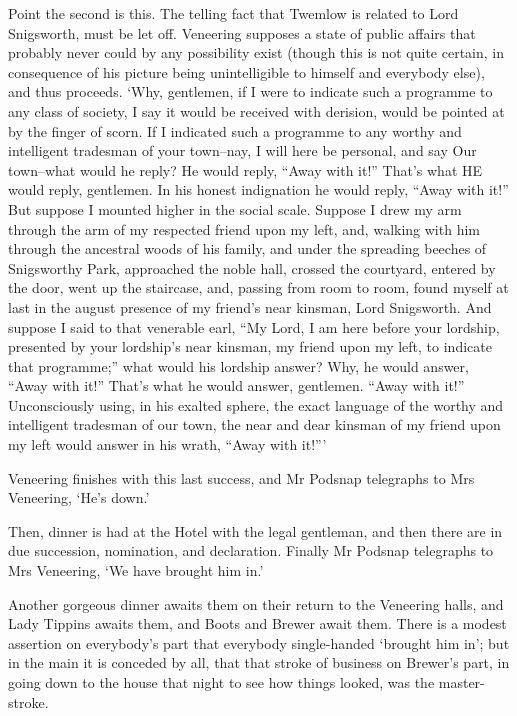 Point the second is this. The telling fact that Twemlow is related to
Lord Snigsworth, must be let off. Veneering supposes a state of public
affairs that probably never could by any possibility exist (though this
is not quite certain, in consequence of his picture being unintelligible
to himself and everybody else), and thus proceeds. ‘Why, gentlemen, if
I were to indicate such a programme to any class of society, I say it
would be received with derision, would be pointed at by the finger of
scorn. If I indicated such a programme to any worthy and intelligent
tradesman of your town--nay, I will here be personal, and say Our
town--what would he reply? He would reply, “Away with it!” That’s what
HE would reply, gentlemen. In his honest indignation he would reply,
“Away with it!” But suppose I mounted higher in the social scale.
Suppose I drew my arm through the arm of my respected friend upon my
left, and, walking with him through the ancestral woods of his family,
and under the spreading beeches of Snigsworthy Park, approached the
noble hall, crossed the courtyard, entered by the door, went up the
staircase, and, passing from room to room, found myself at last in
the august presence of my friend’s near kinsman, Lord Snigsworth. And
suppose I said to that venerable earl, “My Lord, I am here before your
lordship, presented by your lordship’s near kinsman, my friend upon my
left, to indicate that programme;” what would his lordship answer? Why,
he would answer, “Away with it!” That’s what he would answer, gentlemen.
“Away with it!” Unconsciously using, in his exalted sphere, the exact
language of the worthy and intelligent tradesman of our town, the near
and dear kinsman of my friend upon my left would answer in his wrath,
“Away with it!”’

Veneering finishes with this last success, and Mr Podsnap telegraphs to
Mrs Veneering, ‘He’s down.’

Then, dinner is had at the Hotel with the legal gentleman, and then
there are in due succession, nomination, and declaration. Finally Mr
Podsnap telegraphs to Mrs Veneering, ‘We have brought him in.’

Another gorgeous dinner awaits them on their return to the Veneering
halls, and Lady Tippins awaits them, and Boots and Brewer await
them. There is a modest assertion on everybody’s part that everybody
single-handed ‘brought him in’; but in the main it is conceded by all,
that that stroke of business on Brewer’s part, in going down to the
house that night to see how things looked, was the master-stroke.

